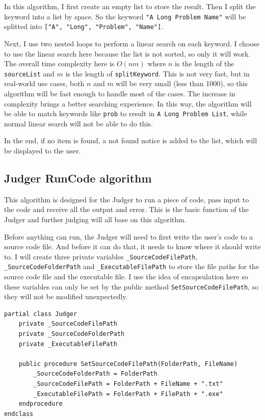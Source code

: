 \documentclass[a4paper]{report}
\begin{document}
In this algorithm, I first create an empty list to store the result. Then I split the keyword into a list by space. So the keyword \texttt{"A Long Problem Name"} will be splitted into \texttt{["A", "Long", "Problem", "Name"]}.

Next, I use two nested loops to perform a linear search on each keyword. I choose to use the linear search here because the list is not sorted, so only it will work. The overall time complexity here is $O(nm)$ where $n$ is the length of the \texttt{sourceList} and $m$ is the length of \texttt{splitKeyword}. This is not very fast, but in real-world use cases, both $n$ and $m$ will be very small (less than 1000), so this algorithm will be fast enough to handle most of the cases. The increase in complexity brings a better searching experience. In this way, the algorithm will be able to match keywords like \texttt{prob} to result in \texttt{A Long Problem List}, while normal linear search will not be able to do this.

In the end, if no item is found, a not found notice is added to the list, which will be displayed to the user.

\subsection{Judger RunCode algorithm}

This algorithm is designed for the Judger to run a piece of code, pass input to the code and receive all the output and error. This is the basic function of the Judger and further judging will all base on this algorithm.

Before anything can run, the Judger will need to first write the user's code to a source code file. And before it can do that, it needs to know where it should write to. I will create three private variables \texttt{_SourceCodeFilePath}, \texttt{_SourceCodeFolderPath} and \texttt{_ExecutableFilePath} to store the file paths for the source code file and the executable file. I use the idea of encapsulation here so these variables can only be set by the public method \texttt{SetSourceCodeFilePath}, so they will not be modified unexpectedly.

\begin{verbatim}
partial class Judger
    private _SourceCodeFilePath
    private _SourceCodeFolderPath
    private _ExecutableFilePath

    public procedure SetSourceCodeFilePath(FolderPath, FileName)
        _SourceCodeFolderPath = FolderPath
        _SourceCodeFilePath = FolderPath + FileName + ".txt"
        _ExecutableFilePath = FolderPath + FilePath + ".exe"
    endprocedure
endclass
\end{verbatim}
\end{document}

